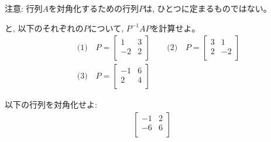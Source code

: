 注意: 行列$A$を対角化するための行列$P$は, ひとつに定まるものではない。

\begin{q}\label{q:matrix_orth2D_Pvariable} と, 
以下のそれぞれの$P$について, $P^{-1}AP$を計算せよ。
\begin{eqnarray*}
&&\text{(1)}\quad 
P=\begin{bmatrix}
1 & 3 \\
-2 & 2 \\
\end{bmatrix}\quad\quad 
\text{(2)}\quad 
P=\begin{bmatrix}
3 & 1 \\
2 & -2 \\
\end{bmatrix}\\
&&\text{(3)}\quad 
P=\begin{bmatrix}
-1 & 6 \\
2  & 4 \\
\end{bmatrix}
\end{eqnarray*}
\end{q}

\begin{q}\label{q:matrix_orth2D0} 以下の行列を対角化せよ:
\begin{eqnarray} \begin{bmatrix}
-1 & 2\\
-6 & 6\\
\end{bmatrix}\end{eqnarray}
\end{q}\mv

